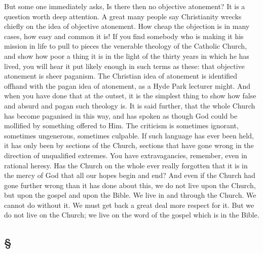 \documentclass[draft]{ptfdoc}
\begin{document}
But some one immediately asks, Is there then 
no objective atonement? It is a question worth 
deep attention. A great many people say 
Christianity wrecks chiefly on the idea of objective 
atonement. How cheap the objection is 
in many cases, how easy and common it is! If 
you find somebody who is making it his mission 
in life to pull to pieces the venerable theology of 
the Catholic Church, and show how poor a thing 
it is in the light of the thirty years in which he 
has lived, you will hear it put likely enough in 
such terms as these: that objective atonement is 
sheer paganism. The Christian idea of atonement 
is identified offhand with the pagan idea 
of atonement, as a Hyde Park lecturer might. 
And when you have done that at the outset, it 
is the simplest thing to show how false and 
absurd and pagan such theology is. It is said 
further, that the whole Church has become 
paganised in this way, and has spoken as though 
God could be mollified by something offered to 
Him. The criticism is sometimes ignorant, 
sometimes ungenerous, sometimes culpable. If 
such language has ever been held, it has only 
been by sections of the Church, sections that 
have gone wrong in the direction of unqualified 
extremes. You have extravagancies, remember, 
even in rational heresy. Has the Church on 
the whole ever really forgotten that it is in 
the mercy of God that all our hopes begin and 
end? And even if the Church had gone further 
wrong than it has done about this, we do not 
live upon the Church, but upon the gospel and 
upon the Bible. We live in and through the 
Church. We cannot do without it. We must 
get back a great deal more respect for it. But 
we do not live on the Church; we live on the 
word of the gospel which is in the Bible. 

\subsection*{
\S
}
\end{document}
